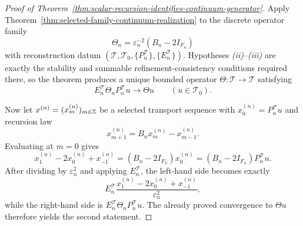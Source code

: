 \begin{proof}[Proof of Theorem~\ref{thm:scalar-recursion-identifies-continuum-generator}]
\label{proof:thm:scalar-recursion-identifies-continuum-generator}
Apply Theorem~\ref{thm:selected-family-continuum-realization} to the discrete
operator family
\[
\Theta_n=\varepsilon_n^{-2}(B_n-2I_{F_n})
\]
with reconstruction datum
\((\mathcal T,\mathcal T_0,\{P_n^{\mathcal T}\},\{E_n^{\mathcal T}\})\).
Hypotheses \emph{(ii)}--\emph{(iii)} are exactly the stability and summable
refinement-consistency conditions required there, so the theorem produces a
unique bounded operator \(\Theta:\mathcal T\to\mathcal T\) satisfying
\[
E_n^{\mathcal T}\Theta_nP_n^{\mathcal T}u\to \Theta u
\qquad (u\in\mathcal T_0).
\]

Now let \(x^{(n)}=(x_m^{(n)})_{m\in\mathbb{Z}}\) be a selected transport sequence
with \(x_0^{(n)}=P_n^{\mathcal T}u\) and recursion law
\[
x_{m+1}^{(n)}=B_nx_m^{(n)}-x_{m-1}^{(n)}.
\]
Evaluating at \(m=0\) gives
\[
x_1^{(n)}-2x_0^{(n)}+x_{-1}^{(n)}
=(B_n-2I_{F_n})x_0^{(n)}
=(B_n-2I_{F_n})P_n^{\mathcal T}u.
\]
After dividing by \(\varepsilon_n^2\) and applying \(E_n^{\mathcal T}\), the
left-hand side becomes exactly
\[
E_n^{\mathcal T}\frac{x_1^{(n)}-2x_0^{(n)}+x_{-1}^{(n)}}{\varepsilon_n^2},
\]
while the right-hand side is \(E_n^{\mathcal T}\Theta_nP_n^{\mathcal T}u\).
The already proved convergence to \(\Theta u\) therefore yields the second
statement.
\end{proof}

